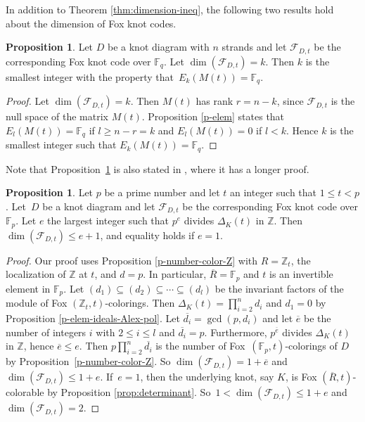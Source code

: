 \documentclass[11pt,a4paper]{article}
\theoremstyle{definition}
\newtheorem{proposition}[theorem]{Proposition}
\newcommand{\numberset}{\mathbb}
\newcommand{\F}{\numberset{F}}
\newcommand{\Z}{\numberset{Z}}
\newcommand{\mF}{\mathcal{F}}
\begin{document}
In addition to Theorem \ref{thm:dimension-ineq}, the following two results hold 
about the dimension of Fox knot codes.


\begin{proposition}
\label{prop:dimension}
Let $D$ be a knot diagram with $n$ strands and let $\mF_{D,t}$ be the corresponding Fox knot code over $\F_q$. 
Let $\dim(\mF_{D,t}) = k$. Then $k$ is the smallest integer with the property that~$E_k(M(t))=\F_q$.
\end{proposition}

\begin{proof}
Let $\dim(\mF_{D,t}) = k$. Then $M(t)$ has rank $r=n-k$, since $\mF_{D,t}$ is the null space of the matrix $M(t)$. 
Proposition \ref{p-elem} states that $E_l(M(t))=\F_q$ if $l\geq n-r=k$ and $E_l(M(t))=0$ if $l<k$.
Hence $k$ is the smallest integer such that $E_k(M(t))=\F_q$.
\end{proof}

Note that Proposition~\ref{prop:dimension} is also stated in \cite[Corollary 12]{traldi2018}, where it has a longer proof. 

\begin{proposition}\label{p-dim-prime-e}
Let $p$ be a prime number and let $t$ an integer such that $1\leq t<p$.
Let~$D$ be a knot diagram and let
$\mF_{D,t}$ be the corresponding Fox knot code over $\F_p$. 
Let $e$ the largest integer such that $p^e$ divides $\Delta_K(t)$ in $\Z$. 
Then $\dim(\mF_{D,t}) \leq e+1$, and equality holds if $e=1$.
\end{proposition}

\begin{proof}
Our proof uses Proposition \ref{p-number-color-Z} with $R=\Z_t$, the localization of $\Z$ at $t$, and $d=p$. In particular,  $\overline{R}=\F_p$ and 
$t$ is an invertible element in $\F_p$.
Let $(d_1)\subseteq (d_2)\subseteq \cdots \subseteq (d_l)$ be the invariant factors of the module of Fox $(\Z_t,t)$-colorings.
Then $\Delta_K(t)=\prod_{i=2}^n d_i$ and $d_1=0$ by Proposition \ref{p-elem-ideals-Alex-pol}.
Let $\overline{d_i}=\gcd (p,d_i)$ and let $\overline{e}$ be the number of integers $i$ with $2 \leq i \leq l$ and $\overline{d_i}=p$. 
Furthermore, $p^{\overline{e}}$ divides $\Delta_K(t)$ in $\Z$, hence
$\overline{e} \leq e$.
Then $p\prod_{i=2}^n\overline{d_i}$ is the number of Fox~$(\F_p,t)$-colorings of $D$ by Proposition~\ref{p-number-color-Z}. So $\dim(\mF_{D,t})=1 + \overline{e}$
and $\dim(\mF_{D,t})\leq 1 + e$. If~$e=1$, then the underlying knot, say $K$, is Fox $(\overline{R},t)$-colorable by Proposition \ref{prop:determinant}. 
So~$1<\dim(\mF_{D,t})\leq 1 + e$
and $\dim(\mF_{D,t})=2$.
\end{proof}
\end{document}
